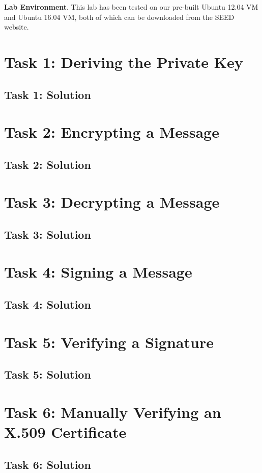 \documentclass[12pt]{article}
\begin{document}
\textbf{Lab Environment}. This lab has been tested on our pre-built Ubuntu 12.04 VM and Ubuntu 16.04 VM, both of which
can be downloaded from the SEED website.

\clearpage




\section{Task 1: Deriving the Private Key}
\subsection{Task 1: Solution}


\clearpage
\section{Task 2: Encrypting a Message}
\subsection{Task 2: Solution}

\clearpage
\section{Task 3: Decrypting a Message}
\subsection{Task 3: Solution}

\clearpage
\section{Task 4: Signing a Message}
\subsection{Task 4: Solution}


\clearpage
\section{Task 5: Verifying a Signature}
\subsection{Task 5: Solution}

\clearpage
\section{Task 6: Manually Verifying an X.509 Certificate}
\subsection{Task 6: Solution}
\end{document}

